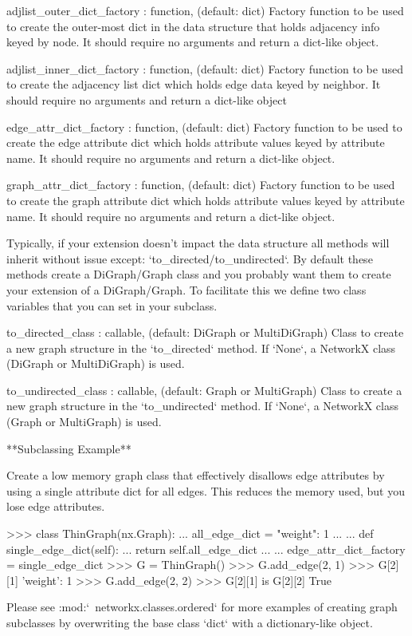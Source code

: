 \begin{DoxyVerb}
adjlist_outer_dict_factory : function, (default: dict)
    Factory function to be used to create the outer-most dict
    in the data structure that holds adjacency info keyed by node.
    It should require no arguments and return a dict-like object.

adjlist_inner_dict_factory : function, (default: dict)
    Factory function to be used to create the adjacency list
    dict which holds edge data keyed by neighbor.
    It should require no arguments and return a dict-like object

edge_attr_dict_factory : function, (default: dict)
    Factory function to be used to create the edge attribute
    dict which holds attribute values keyed by attribute name.
    It should require no arguments and return a dict-like object.

graph_attr_dict_factory : function, (default: dict)
    Factory function to be used to create the graph attribute
    dict which holds attribute values keyed by attribute name.
    It should require no arguments and return a dict-like object.

Typically, if your extension doesn't impact the data structure all
methods will inherit without issue except: `to_directed/to_undirected`.
By default these methods create a DiGraph/Graph class and you probably
want them to create your extension of a DiGraph/Graph. To facilitate
this we define two class variables that you can set in your subclass.

to_directed_class : callable, (default: DiGraph or MultiDiGraph)
    Class to create a new graph structure in the `to_directed` method.
    If `None`, a NetworkX class (DiGraph or MultiDiGraph) is used.

to_undirected_class : callable, (default: Graph or MultiGraph)
    Class to create a new graph structure in the `to_undirected` method.
    If `None`, a NetworkX class (Graph or MultiGraph) is used.

**Subclassing Example**

Create a low memory graph class that effectively disallows edge
attributes by using a single attribute dict for all edges.
This reduces the memory used, but you lose edge attributes.

>>> class ThinGraph(nx.Graph):
...     all_edge_dict = {"weight": 1}
...
...     def single_edge_dict(self):
...         return self.all_edge_dict
...
...     edge_attr_dict_factory = single_edge_dict
>>> G = ThinGraph()
>>> G.add_edge(2, 1)
>>> G[2][1]
{'weight': 1}
>>> G.add_edge(2, 2)
>>> G[2][1] is G[2][2]
True

Please see :mod:`~networkx.classes.ordered` for more examples of
creating graph subclasses by overwriting the base class `dict` with
a dictionary-like object.
\end{DoxyVerb}
 

